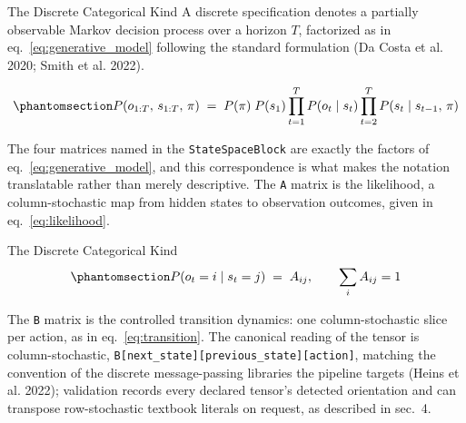 \documentclass[
  ignorenonframetext,
]{beamer}
\begin{document}
\begin{frame}{The Discrete Categorical Kind}
\protect{}\label{the-discrete-categorical-kind}
A discrete specification denotes a partially observable Markov decision
process over a horizon \(T\), factorized as in
eq.~\ref{eq:generative_model} following the standard formulation (Da
Costa et al. 2020; Smith et al. 2022).

\begin{equation}\protect\phantomsection\label{eq:generative_model}{
P(o_{1:T},\, s_{1:T},\, \pi) \;=\; P(\pi)\; P(s_1) \prod_{t=1}^{T} P(o_t \mid s_t) \prod_{t=2}^{T} P(s_t \mid s_{t-1},\, \pi)
}\end{equation}

The four matrices named in the \texttt{StateSpaceBlock} are exactly the
factors of eq.~\ref{eq:generative_model}, and this correspondence is
what makes the notation translatable rather than merely descriptive. The
\texttt{A} matrix is the likelihood, a column-stochastic map from hidden
states to observation outcomes, given in eq.~\ref{eq:likelihood}.

\end{frame}

\begin{frame}{The Discrete Categorical Kind}
\begin{equation}\protect\phantomsection\label{eq:likelihood}{
P(o_t = i \mid s_t = j) \;=\; A_{ij}, \qquad \sum_i A_{ij} = 1
}\end{equation}

The \texttt{B} matrix is the controlled transition dynamics: one
column-stochastic slice per action, as in eq.~\ref{eq:transition}. The
canonical reading of the tensor is column-stochastic,
\texttt{B{[}next\_state{]}{[}previous\_state{]}{[}action{]}}, matching
the convention of the discrete message-passing libraries the pipeline
targets (Heins et al. 2022); validation records every declared tensor's
detected orientation and can transpose row-stochastic textbook literals
on request, as described in sec.~4.

\end{frame}
\end{document}
